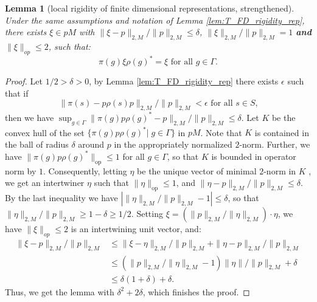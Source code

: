 \documentclass[11pt]{amsart}
\DeclareMathOperator{\op}{op}
\newcommand{\C}{{\mathbb{C}}}
\newtheorem{lemma}[theorem]{Lemma}
\theoremstyle{definition}
\theoremstyle{remark}
\theoremstyle{definition}
\begin{document}
\begin{lemma}[local rigidity of finite dimensional representations, strengthened]
\label{lem:T_FD_rigidity_rep_strong}
Under the same assumptions and notation of Lemma \ref{lem:T_FD_rigidity_rep}, there exists $\xi \in p M$ with $ \| \xi -p \|_{2,M}  / \| p \|_{2,M}\leq \delta $, $\| \xi\|_{2,M} / \| p\|_{2,M} = 1$ \textbf{and} $\| \xi \|_{op} \leq 2$, such that:
$$ \pi(g)\xi\rho(g)^* = \xi   \text{ for all $g \in \Gamma$.}$$
\end{lemma}

\begin{proof}
    Let $1/2 > \delta> 0$, by Lemma \ref{lem:T_FD_rigidity_rep} there exists $\epsilon$ such that if 
$$\| \pi(s) - p\rho(s) p\|_{2,M} / \|p \|_{2,M}< \epsilon \text{ for all $s \in S$,}$$
    then we have $\sup_{g \in \Gamma}\| \pi(g)  p\rho(g)^* - p\|_{2,M} / \|p \|_{2,M} \leq \delta$. Let $K$ be the convex hull of the set $\{ \pi(g) p \rho(g)^* | \; g \in \Gamma \}$ in $pM$. Note that $K$ is contained in the ball of radius $\delta$ around $p$ in the appropriately normalized $2$-norm.
    Further, we have $\| \pi(g) p \rho(g)^*\|_{\op} \leq 1$ for all $g \in \Gamma$, so that $K$ is bounded in operator norm by $1$.
    Consequently, letting $\eta$ be the unique vector of minimal $2$-norm in $K$ , we get an intertwiner $\eta$ such that $\| \eta \|_{\op} \leq 1$, and $ \| \eta -p \|_{2,M}  / \| p \|_{2,M}\leq \delta$.
    By the last inequality we have $|\| \eta \|_{2, M}  / \| p \|_{2,M} - 1| \leq \delta$, so that $\| \eta  \|_{2,M} / \| p \|_{2,M} \geq 1-\delta \geq  1/2$.
    Setting $\xi = (\| p\|_{2,M} / \| \eta \|_{2,M}) \cdot\eta $, we have $\| \xi \|_{op} \leq 2$ is an intertwining unit vector, and:
    \begin{align*}
        \| \xi - p \|_{2,M} / \| p \|_{2,M} &\leq \| \xi - \eta \|_{2,M} / \| p \|_{2,M} + \| \eta - p \|_{2,M} / \| p \|_{2,M} \\
        &\leq (\|p\|_{2,M} / \|\eta \|_{2,M} - 1)\| \eta  \| / \| p \|_{2,M} + \delta \\
        &\leq \delta (1 + \delta) + \delta.
    \end{align*}
    Thus, we get the lemma with $\delta^2 + 2 \delta$, which finishes the proof.
    
\end{proof}
\end{document}

